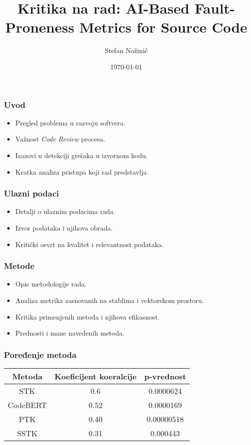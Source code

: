 \documentclass{beamer}
\title[Kritika: AI-Based Fault-Proneness Metrics]{Kritika na rad: AI-Based Fault-Proneness Metrics for Source Code}
\institute{Univerzitet u Novom Sadu}
\author{Stefan Nožinić}
\date{\today}
\begin{document}
\begin{frame}
  \titlepage
\end{frame}

\begin{frame}
\frametitle{Uvod}
\begin{itemize}
    \item Pregled problema u razvoju softvera.
    \item Važnost \textit{Code Review} procesa.
    \item Izazovi u detekciji grešaka u izvornom kodu.
    \item Kratka analiza pristupa koji rad predstavlja.
\end{itemize}
\end{frame}

\begin{frame}
\frametitle{Ulazni podaci}
\begin{itemize}
    \item Detalji o ulaznim podacima rada.
    \item Izvor podataka i njihova obrada.
    \item Kritički osvrt na kvalitet i relevantnost podataka.
\end{itemize}
\end{frame}

\begin{frame}
\frametitle{Metode}
\begin{itemize}
    \item Opis metodologije rada.
    \item Analiza metrika zasnovanih na stablima i vektorskom prostoru.
    \item Kritika primenjenih metoda i njihova efikasnost.
    \item Prednosti i mane navedenih metoda.
\end{itemize}
\end{frame}

\begin{frame}
    \frametitle{Poređenje metoda}
    \begin{table}[ht]
    \centering
    \begin{tabular}{|c|c|c|}
    \hline
    Metoda & Koeficijent koeralcije & p-vrednost \\
    \hline
    STK        & 0.6 &0.0000624 \\
    CodeBERT   & 0.52&0.0000169 \\
    PTK        & 0.40    & 0.00000518         \\
    SSTK   &   0.31  & 0.000443         \\
    \hline
    \end{tabular}
    \end{table}
\end{frame}
    
\end{document}

